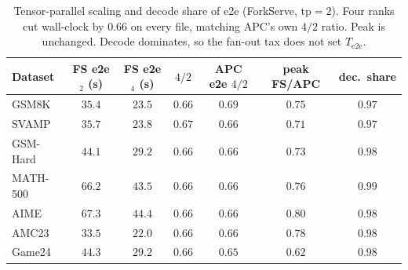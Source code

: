 \documentclass[11pt,a4paper]{article}
\begin{document}
\begin{table}[h]
\centering
\small
{}
\caption{Fan-out work and winner decode tokens.
ForkServe pays abort and copy-on-write, so fan-out is $1.2$--$1.9\times$ APC; that step is still $<4\%$ of $T_{\mathrm{e2e}}$.
APC always emits the decode budget; ForkServe stops early on GSM8K and SVAMP, which is why those files can be slightly faster at matched $W$.}
\end{table}

\begin{table}[h]
\centering
\small
\begin{tabular}{@{}lcccccc@{}}
\toprule
Dataset & FS e2e$_2$ (s) & FS e2e$_4$ (s) & $4/2$ & APC e2e $4/2$ & peak FS/APC & dec.\ share \\
\midrule
GSM8K    & $35.4$ & $23.5$ & $0.66$ & $0.69$ & $0.75$ & $0.97$ \\
SVAMP    & $35.7$ & $23.8$ & $0.67$ & $0.66$ & $0.71$ & $0.97$ \\
GSM-Hard & $44.1$ & $29.2$ & $0.66$ & $0.66$ & $0.73$ & $0.98$ \\
MATH-500 & $66.2$ & $43.5$ & $0.66$ & $0.66$ & $0.76$ & $0.99$ \\
AIME     & $67.3$ & $44.4$ & $0.66$ & $0.66$ & $0.80$ & $0.98$ \\
AMC23    & $33.5$ & $22.0$ & $0.66$ & $0.66$ & $0.78$ & $0.98$ \\
Game24   & $44.3$ & $29.2$ & $0.66$ & $0.65$ & $0.62$ & $0.98$ \\
\bottomrule
\end{tabular}
\caption{Tensor-parallel scaling and decode share of e2e (ForkServe, $\mathrm{tp}{=}2$).
Four ranks cut wall-clock by $0.66$ on every file, matching APC's own $4/2$ ratio.
Peak is unchanged.
Decode dominates, so the fan-out tax does not set $T_{\mathrm{e2e}}$.}
\end{table}
\end{document}
